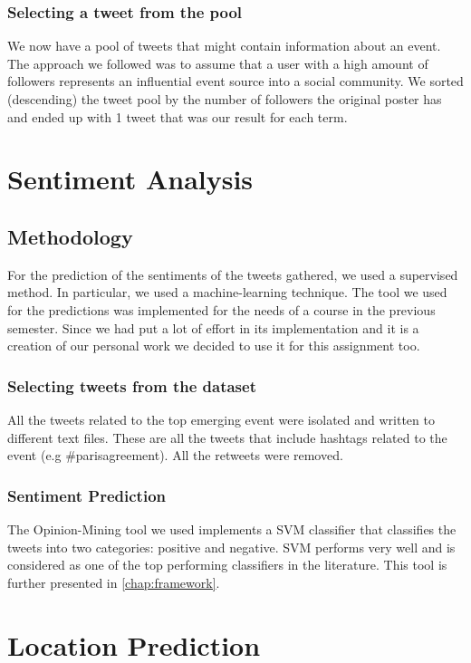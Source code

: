 \documentclass[12pt,svgnames]{report}
\begin{document}
\subsubsection*{Selecting a tweet from the pool}
We now have a pool of tweets that might contain information about an event. The approach we followed was to assume that a user with a high amount of followers represents an influential event source  into a social community\cite{cataldi2013personalized}. We sorted (descending) the tweet pool by the number of followers the original poster has and ended up with 1 tweet that was our result for each term.
\section*{Sentiment Analysis}

\subsection*{Methodology}
For the prediction of the sentiments of the tweets gathered, we used a supervised method. In particular, we used a machine-learning technique. The tool we used for the predictions was implemented for the needs of a course in the previous semester. Since we had put a lot of effort in its implementation and it is a creation of our personal work we decided to use it for this assignment too.

\subsubsection*{Selecting tweets from the dataset}
All the tweets related to the top emerging event were isolated and written to different text files. These are all the tweets that include hashtags related to the event (e.g \#parisagreement). All the retweets  were removed. 

\subsubsection*{Sentiment Prediction}
The Opinion-Mining tool\cite{opinion} we used implements a SVM classifier that classifies the tweets into two categories: positive and negative. SVM performs very well and is considered as one of the top performing classifiers in the literature. This tool is further presented in \autoref{chap:framework}.

\section*{Location Prediction}
\end{document}

